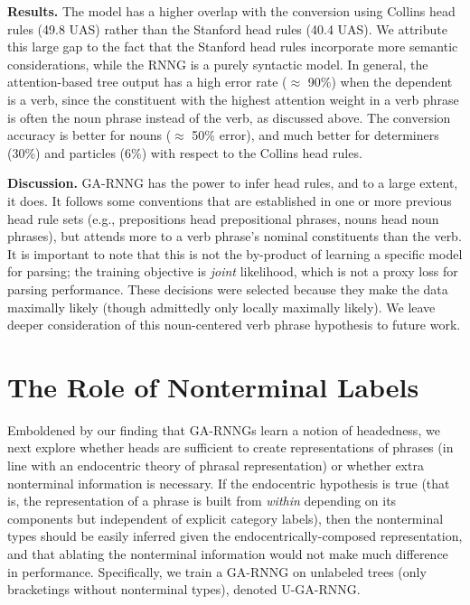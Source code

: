 \documentclass[11pt]{article}
\begin{document}
\textbf{Results.} The model has a higher overlap with the conversion using Collins head rules (49.8 UAS) rather than the Stanford head rules (40.4 UAS). We attribute this large gap to the fact that the Stanford head rules incorporate more semantic considerations, while the RNNG is a purely syntactic model. In general, the attention-based tree output has a high error rate ($\approx$ 90\%) when the dependent is a verb, since the constituent with the highest attention weight in a verb phrase is often the noun phrase instead of the verb, as discussed above. The conversion accuracy is better for nouns ($\approx$ 50\% error), and much better for determiners (30\%) and particles (6\%) with respect to the Collins head rules.

\textbf{Discussion.}  GA-RNNG has the power to infer head rules, and to a large extent, it does.  It follows some conventions that are established in one or more previous head rule sets (e.g., prepositions head prepositional phrases, nouns head noun phrases), but attends more to a verb phrase's nominal constituents than the verb.  It is important to note that this is not the by-product of learning a specific model for parsing; the training objective is \emph{joint} likelihood, which is not a proxy loss for parsing performance.  These decisions were selected because they make the data maximally likely (though admittedly only locally maximally likely).  We leave deeper consideration of this noun-centered verb phrase hypothesis to future work.

\section{The Role of Nonterminal Labels}\label{sec:bracketing}


Emboldened by our finding that GA-RNNGs learn a notion of headedness, we next explore whether heads are sufficient to create representations of phrases (in line with an endocentric theory of phrasal representation) or whether extra nonterminal information is necessary.  If the endocentric hypothesis is true (that is, the representation of a phrase is built from \emph{within} depending on its components but independent of explicit category labels), then the nonterminal types should be easily inferred given the endocentrically-composed representation, and that ablating the nonterminal information would not make much difference in performance. Specifically, we train a GA-RNNG on unlabeled trees (only bracketings without nonterminal types), denoted U-GA-RNNG.  
\end{document}
